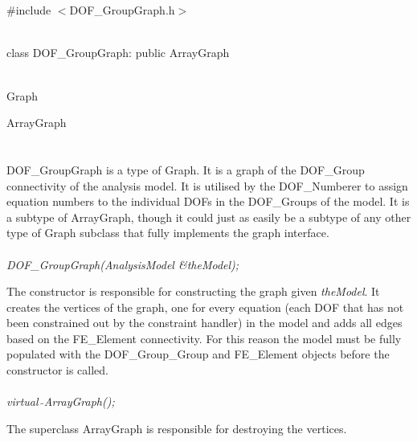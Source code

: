 
 \\

   \\
\#include $<$DOF\_GroupGraph.h$>$  


  \\
class DOF\_GroupGraph: public ArrayGraph 


 \\
Graph 

\indent\indent ArrayGraph \\
\indent\indent{} \\

  \\
\indent DOF\_GroupGraph is a type of Graph. It is a graph of the DOF\_Group
connectivity of the analysis model. It is utilised by the
DOF\_Numberer to assign equation numbers to the individual DOFs in the
DOF\_Groups of the model. It is a subtype of
ArrayGraph, though it could just as easily be a subtype of any other
type of Graph subclass that fully implements the graph interface. \\ 

  \\
{\em DOF\_GroupGraph(AnalysisModel \&theModel);}  

The constructor is responsible for constructing the graph given {\em
theModel}. It creates the vertices of the graph, one for every
equation  (each DOF that has not been constrained out by the
constraint handler)  in the model and adds all edges based on the FE\_Element
connectivity. For this reason the model must be fully populated with
the DOF\_Group\_Group and FE\_Element objects before the constructor is
called. \\

  \\
{\em virtual~$\tilde{}$ArrayGraph();}  

The superclass ArrayGraph is responsible for destroying the vertices. \\

  \\

  \\
